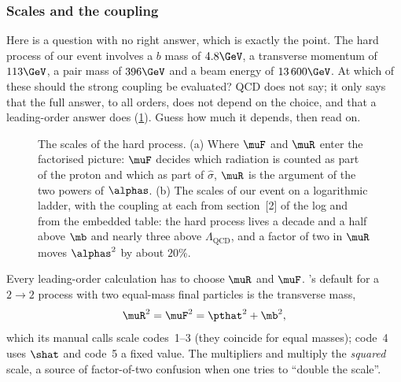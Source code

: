 \subsubsection{Scales and the coupling}
\label{sec:ancestral_home:scales_and_coupling}

Here is a question with no right answer, which is exactly the point. The
hard process of our event involves a $b$ mass of $4.8\GeV$, a transverse
momentum of $113\GeV$, a pair mass of $396\GeV$ and a beam energy of
$13\,600\GeV$. At which of these should the strong coupling be evaluated?
QCD does not say; it only says that the full answer, to all orders, does not
depend on the choice, and that a leading-order answer does
(\cref{fig:ancestral_home:scales_sketch}). Guess how much it depends,
then read on.

\begin{figure}[htbp]\centering
\resizebox{\textwidth}{!}{}
\caption[Where the two scales enter, and the scales of our event on a logarithmic ladder]{The scales of the hard process. (a) Where $\muF$ and $\muR$ enter the factorised picture: $\muF$ decides which radiation is counted as part of the proton and which as part of $\hat\sigma$, $\muR$ is the argument of the two powers of $\alphas$. (b) The scales of our event on a logarithmic ladder, with the coupling at each from section~[2] of the  log and from the embedded table: the hard process lives a decade and a half above $\mb$ and nearly three above $\Lambda_{\mathrm{QCD}}$, and a factor of two in $\muR$ moves $\alphas^2$ by about $20\%$.}
\label{fig:ancestral_home:scales_sketch}
\end{figure}

Every leading-order calculation has to choose $\muR$ and $\muF$. \PYTHIA's
default for a $2\to2$ process with two equal-mass final particles is the
transverse mass,
\begin{equation}
  \muR^2 = \muF^2 = \pthat^2 + \mb^2 ,
  \label{eq:ancestral_home:scale_choice}
\end{equation}
which its manual calls scale codes~1--3 (they coincide for equal masses);
code~4 uses $\shat$ and code~5 a fixed value. The multipliers
 and  multiply the
\emph{squared} scale, a source of factor-of-two confusion when one tries to
``double the scale''.

